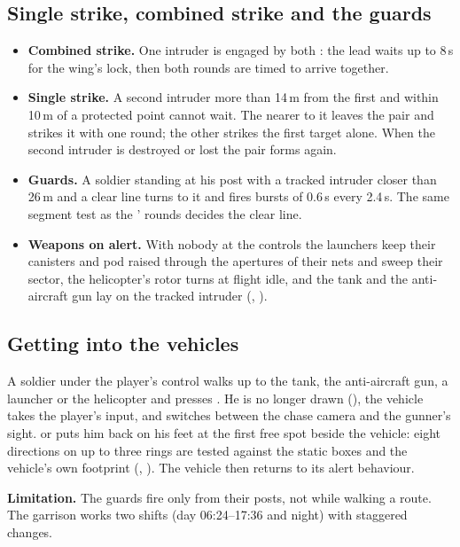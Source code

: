 \subsection{Single strike, combined strike and the guards}
\label{sec:coop}
\begin{itemize}
\item \textbf{Combined strike.} One intruder is engaged by both : the lead waits up to 8\,s for the wing's lock,
then both rounds are timed to arrive together.
\item \textbf{Single strike.} A second intruder more than 14\,m from the first and within 10\,m of a protected point
cannot wait. The  nearer to it leaves the pair and strikes it with one round; the other  strikes the first target
alone. When the second intruder is destroyed or lost the pair forms again.
\item \textbf{Guards.} A soldier standing at his post with a tracked intruder closer than 26\,m and a clear line turns to
it and fires bursts of 0.6\,s every 2.4\,s. The same segment test as the ' rounds decides the clear line.
\item \textbf{Weapons on alert.} With nobody at the controls the launchers keep their canisters and pod raised through
the apertures of their nets and sweep their sector, the helicopter's rotor turns at flight idle, and the tank and the
anti-aircraft gun lay on the tracked intruder (, ).
\end{itemize}

\subsection{Getting into the vehicles}
\label{sec:board}
A soldier under the player's control walks up to the tank, the anti-aircraft gun, a launcher or the helicopter and
presses . He is no longer drawn (), the vehicle takes the player's input, and 
switches between the chase camera and the gunner's sight.  or  puts him back on his feet at the first
free spot beside the vehicle: eight directions on up to three rings are tested against the static boxes and the
vehicle's own footprint (, ). The vehicle then returns to its alert
behaviour.

\textbf{Limitation.} The guards fire only from their posts, not while walking a route. The garrison works two shifts
(day 06:24--17:36 and night) with staggered changes.
